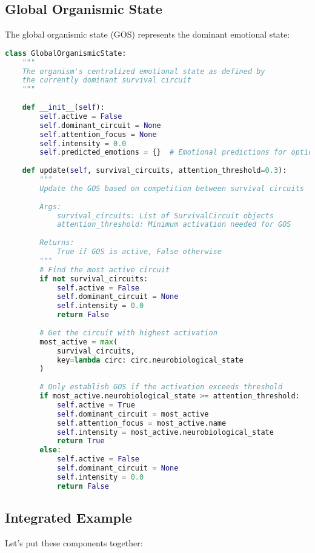 \documentclass[11pt,a4paper]{article}
\begin{document}
\subsection{Global Organismic State}

The global organismic state (GOS) represents the dominant emotional state:

\begin{lstlisting}[language=Python]
class GlobalOrganismicState:
    """
    The organism's centralized emotional state as defined by
    the currently dominant survival circuit
    """
    
    def __init__(self):
        self.active = False
        self.dominant_circuit = None
        self.attention_focus = None
        self.intensity = 0.0
        self.predicted_emotions = {}  # Emotional predictions for options
        
    def update(self, survival_circuits, attention_threshold=0.3):
        """
        Update the GOS based on competition between survival circuits
        
        Args:
            survival_circuits: List of SurvivalCircuit objects
            attention_threshold: Minimum activation needed for GOS
            
        Returns:
            True if GOS is active, False otherwise
        """
        # Find the most active circuit
        if not survival_circuits:
            self.active = False
            self.dominant_circuit = None
            self.intensity = 0.0
            return False
            
        # Get the circuit with highest activation
        most_active = max(
            survival_circuits, 
            key=lambda circ: circ.neurobiological_state
        )
        
        # Only establish GOS if the activation exceeds threshold
        if most_active.neurobiological_state >= attention_threshold:
            self.active = True
            self.dominant_circuit = most_active
            self.attention_focus = most_active.name
            self.intensity = most_active.neurobiological_state
            return True
        else:
            self.active = False
            self.dominant_circuit = None
            self.intensity = 0.0
            return False
\end{lstlisting}

\subsection{Integrated Example}
Let's put these components together:
\end{document}

